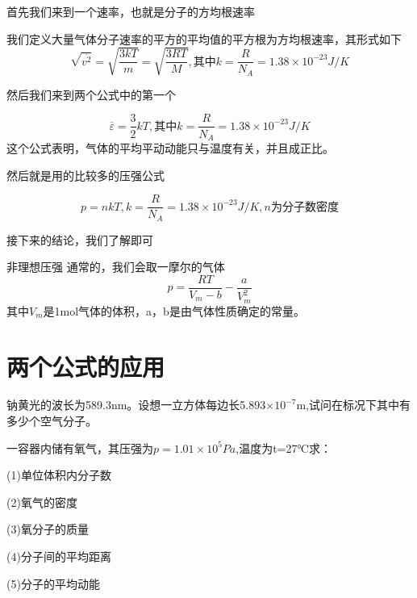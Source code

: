\documentclass[lang=cn,10pt]{elegantbook}
\begin{document}
	首先我们来到一个速率，也就是分子的方均根速率
	
	\begin{definition}[方均根速率]
		我们定义大量气体分子速率的平方的平均值的平方根为方均根速率，其形式如下
		\begin{equation*}
			\sqrt{\overline{v^2}}=\sqrt{\frac{3kT}{m}}=\sqrt{\frac{3RT}{M}},\text{其中}k=\frac{R}{N_{A}}=1.38\times10^{-23}J/K
		\end{equation*}
	\end{definition}
	
	然后我们来到两个公式中的第一个
	\begin{theorem}[平均平动动能公式]
		\begin{equation*}
			\overline{\varepsilon }=\frac{3}{2}kT,\text{其中}k=\frac{R}{N_{A}}=1.38\times10^{-23}J/K
		\end{equation*}
		这个公式表明，气体的平均平动动能只与温度有关，并且成正比。
	\end{theorem}
	
	然后就是用的比较多的压强公式
	\begin{theorem}[压强公式]
		\begin{equation*}
			p=nkT,k=\frac{R}{N_{A}}=1.38\times10^{-23}J/K,n\text{为分子数密度}
		\end{equation*}
	\end{theorem}
	接下来的结论，我们了解即可
	\begin{theorem}[范德瓦尔斯气体压强]{非理想压强}
		通常的，我们会取一摩尔的气体
		\begin{equation*}
			p=\frac{RT}{V_m-b}-\frac{a}{V_{m}^{2}}
		\end{equation*}
		其中$V_{m}$是1mol气体的体积，a，b是由气体性质确定的常量。
	\end{theorem}
	
	\section{两个公式的应用}
	\begin{example}
		钠黄光的波长为589.3nm。设想一立方体每边长5.893$\times 10 ^{-7}$m,试问在标况下其中有多少个空气分子。
	\end{example}
	\begin{solution}
		
	\end{solution}
	
	\begin{example}
		一容器内储有氧气，其压强为$p=1.01\times 10^{5}Pa$,温度为t=27$℃$求：
		
		(1)单位体积内分子数
		
		(2)氧气的密度
		
		(3)氧分子的质量
		
		(4)分子间的平均距离
		
		(5)分子的平均动能
	\end{example}
	\begin{solution}
		
	\end{solution}
	
\end{document}
